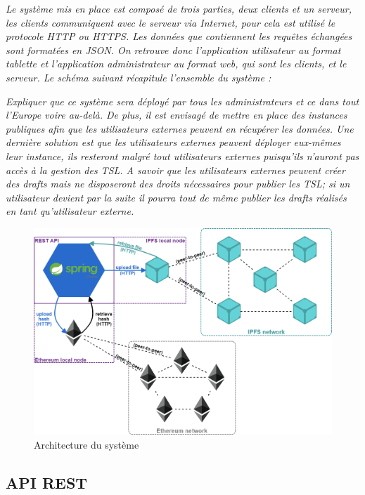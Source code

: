 \documentclass{tnreport}
\begin{document}
{\em
	Le système mis en place est composé de trois parties, deux clients et un serveur, les clients
	communiquent avec le serveur via Internet, pour cela est utilisé le protocole HTTP ou HTTPS. Les
	données que contiennent les requêtes échangées sont formatées en JSON. On retrouve donc l'application utilisateur au format tablette et l'application administrateur au format web, qui sont les clients, et le serveur. Le schéma suivant récapitule l'ensemble du système :
}

{\em
	Expliquer que ce système sera déployé par tous les administrateurs et ce dans tout l'Europe voire au-delà. De plus, il est envisagé de mettre en place des instances publiques afin que les utilisateurs externes peuvent en récupérer les données. Une dernière solution est que les utilisateurs externes peuvent déployer eux-mêmes leur instance, ils resteront malgré tout utilisateurs externes puisqu'ils n'auront pas accès à la gestion des TSL. A savoir que les utilisateurs externes peuvent créer des drafts mais ne disposeront des droits nécessaires pour publier les TSL; si un utilisateur devient par la suite il pourra tout de même publier les drafts réalisés en tant qu'utilisateur externe.
}

\begin{figure}[h]
	\centering
	\includegraphics[scale=0.45]{figures/architecture}
	\caption{Architecture du système}
	\label{fig:architecture}
\end{figure}

\subsection{API REST}
\end{document}
